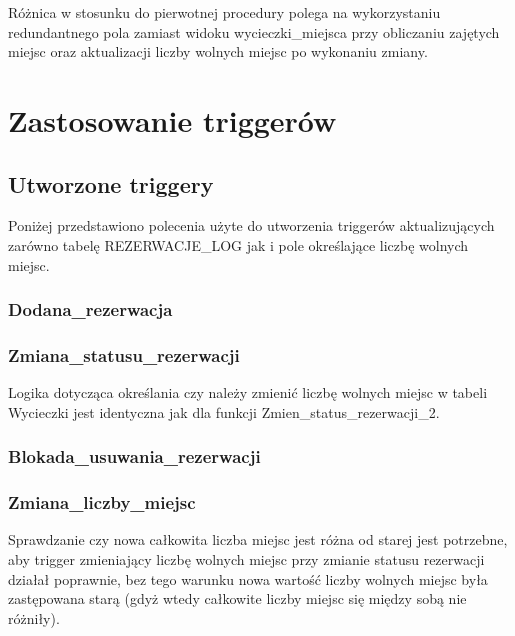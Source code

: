 \documentclass[12pt, a4paper]{mwrep}
\begin{document}
Różnica w stosunku do pierwotnej procedury polega na wykorzystaniu redundantnego pola zamiast widoku wycieczki\_miejsca przy obliczaniu zajętych miejsc oraz aktualizacji liczby wolnych miejsc po wykonaniu zmiany.

\chapter{Zastosowanie triggerów}

\section{Utworzone triggery}

Poniżej przedstawiono polecenia użyte do utworzenia triggerów aktualizujących zarówno tabelę REZERWACJE\_LOG jak i pole określające liczbę wolnych miejsc.

\subsection{Dodana\_rezerwacja}



\subsection{Zmiana\_statusu\_rezerwacji}



Logika dotycząca określania czy należy zmienić liczbę wolnych miejsc w tabeli Wycieczki jest identyczna jak dla funkcji Zmien\_status\_rezerwacji\_2.

\subsection{Blokada\_usuwania\_rezerwacji}



\subsection{Zmiana\_liczby\_miejsc}



Sprawdzanie czy nowa całkowita liczba miejsc jest różna od starej jest potrzebne, aby trigger zmieniający liczbę wolnych miejsc przy zmianie statusu rezerwacji działał poprawnie, bez tego warunku nowa wartość liczby wolnych miejsc była zastępowana starą (gdyż wtedy całkowite liczby miejsc się między sobą nie różniły).
\end{document}
